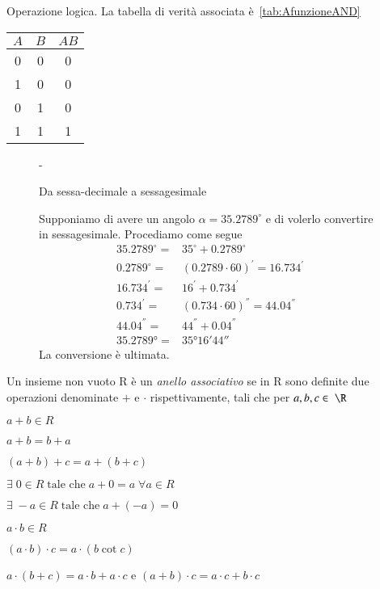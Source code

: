 Operazione logica. La tabella di verità associata è~\vref{tab:AfunzioneAND}
\begin{table}
	\label{tab:AfunzioneAND}
	\centering
	\begin{tabular}{ccc}
	\toprule
	$A$&$B$&$AB$\\
	\midrule  
	0&0&0\\
	1&0&0\\
	0&1&0\\
	1&1&1\\
	\bottomrule
\end{tabular}
\end{table}
\begin{figure}%
	\def\FrameCommand{\fboxsep=\FrameSep \colorbox{shadecolor}}%
	\begin{MakeFramed}{\advance\hsize-\width \FrameRestore}%
		\begin{center}%
			\textcolor{StrongGray}{\textsf{Da sessa-decimale a sessagesimale}}%
			\par%
			\vspace*{-\smallskipamount}%
			\vrule height 0.8pt width 56mm%
		\end{center}%
		\begin{small}%
			Supponiamo di avere un angolo $\alpha=35.2789^{\circ}$ e di volerlo convertire in sessagesimale. Procediamo come segue
			\begin{align*}
			35.2789^{\circ}=&35^{\circ}+0.2789^{\circ}\\
			0.2789^{\circ}=&(0.2789\cdot 60)^{'}=16.734^{'}\\
			16.734^{'}=&16^{'}+0.734^{'}\\
			0.734^{'}=&(0.734\cdot 60 )^{''}=44.04^{''}\\
			44.04^{''}=&44^{''}+0.04^{''}\\
			\ang{35.2789}=&\ang{35;16;44}
			\end{align*}
			La conversione è ultimata.
		\end{small}%
		\vspace*{-\smallskipamount}%
	\end{MakeFramed}%
\end{figure}%
Un insieme non vuoto R è un \textit{anello associativo} se in R sono definite due operazioni denominate $+$ e $\cdot$ rispettivamente, tali che per $a,b,c\in\; \R$
\begin{compactenum}
	\item $a+b\in R$
	\item $a+b=b+a$
	\item $(a+b)+c=a+(b+c)$
	\item $\exists\; 0\in R\;\text{tale che}\; a+0=a\;\forall a\in R$
	\item $\exists\; -a\in R\;\text{tale che}\; a+(-a)=0$
	\item $a\cdot b\in R$
	\item $(a\cdot b)\cdot c=a\cdot(b\cot c)$
	\item $a\cdot(b+c)=a\cdot b+a\cdot c$ e $(a+b)\cdot c=a\cdot c+b\cdot c$
\end{compactenum}
